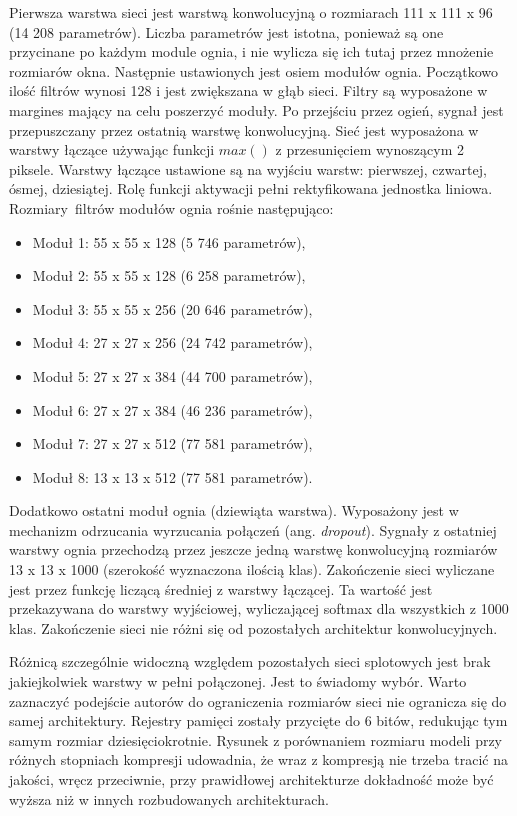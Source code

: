 \documentclass[12pt,a4paper,twoside,titlepage,openright]{book}
\begin{document}
Pierwsza warstwa sieci jest warstwą konwolucyjną o rozmiarach 111 x 111 x 96 (14 208 parametrów). Liczba parametrów jest istotna, ponieważ są one przycinane po każdym module ognia, i nie wylicza się ich tutaj przez mnożenie rozmiarów okna. Następnie ustawionych jest osiem modułów ognia. Początkowo ilość filtrów wynosi 128 i jest zwiększana w głąb sieci. Filtry są wyposażone w margines mający na celu poszerzyć moduły. Po przejściu przez ogień, sygnał jest przepuszczany przez ostatnią warstwę konwolucyjną. Sieć jest wyposażona w warstwy łączące używając funkcji $max()$ z przesunięciem wynoszącym 2 piksele. Warstwy łączące ustawione są na wyjściu warstw: pierwszej, czwartej, ósmej, dziesiątej. Rolę funkcji aktywacji pełni rektyfikowana jednostka liniowa. Rozmiary filtrów modułów ognia rośnie następująco:
\begin{itemize}
\item Moduł 1: 55 x 55 x 128 (5 746 parametrów),
\item Moduł 2: 55 x 55 x 128 (6 258 parametrów), 
\item Moduł 3: 55 x 55 x 256 (20 646 parametrów),
\item Moduł 4: 27 x 27 x 256 (24 742 parametrów),
\item Moduł 5: 27 x 27 x 384 (44 700 parametrów),
\item Moduł 6: 27 x 27 x 384 (46 236 parametrów),
\item Moduł 7: 27 x 27 x 512 (77 581 parametrów),
\item Moduł 8: 13 x 13 x 512 (77 581 parametrów).
\end{itemize}
Dodatkowo ostatni moduł ognia (dziewiąta warstwa). Wyposażony jest w mechanizm odrzucania wyrzucania połączeń (ang. \textit{dropout}). Sygnały z ostatniej warstwy ognia przechodzą przez jeszcze jedną warstwę konwolucyjną rozmiarów 13 x 13 x 1000 (szerokość wyznaczona ilością klas).
Zakończenie sieci wyliczane jest przez funkcję liczącą średniej z warstwy łączącej. Ta wartość jest przekazywana do warstwy wyjściowej, wyliczającej softmax dla wszystkich z 1000 klas. Zakończenie sieci nie różni się od pozostałych architektur konwolucyjnych.

Różnicą szczególnie widoczną względem pozostałych sieci splotowych jest brak jakiejkolwiek warstwy w pełni połączonej. Jest to świadomy wybór. Warto zaznaczyć podejście autorów do ograniczenia rozmiarów sieci nie ogranicza się do samej architektury. Rejestry pamięci zostały przycięte do 6 bitów, redukując tym samym rozmiar dziesięciokrotnie. Rysunek z porównaniem rozmiaru modeli przy różnych stopniach kompresji udowadnia, że wraz z kompresją nie trzeba tracić na jakości, wręcz przeciwnie, przy prawidłowej architekturze dokładność może być wyższa niż w innych rozbudowanych architekturach. \cite{DBLP:journals/corr/IandolaMAHDK16}
\end{document}
